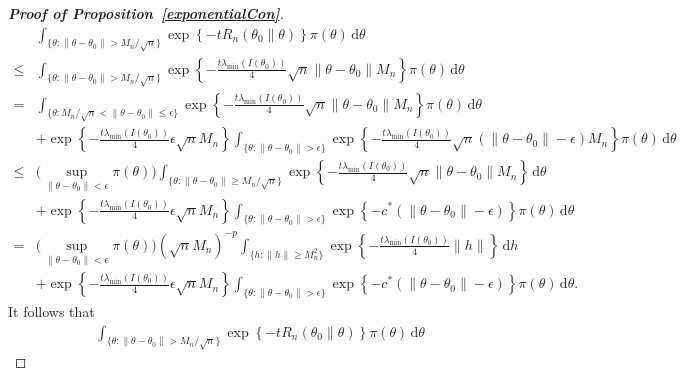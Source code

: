 \documentclass[11pt]{article}
\theoremstyle{plain}
\theoremstyle{definition}
\theoremstyle{remark}
\begin{document}
\begin{appendices}
\begin{proof}[\textbf{Proof of Proposition~\ref{exponentialCon}}]
$$
    \begin{aligned}
        &
\int_{\{\theta:\|\theta-\theta_0\|> M_n/\sqrt{n}\}} \exp\left\{ -t R_n (\theta_0 \| \theta) \right\} \pi(\theta) \, \mathrm d \theta
        \\
        \leq&
        \int_{\{\theta:\|\theta-\theta_0\|> M_n/\sqrt{n}\}} 
        \exp\left\{-\frac{t\lambda_{\min}(I(\theta_0))}{4}\sqrt{n}\|\theta-\theta_0\|M_n\right\}
        \pi(\theta)\, \mathrm d\theta
        \\
        =&
        \int_{\{\theta:M_n/\sqrt{n}< \|\theta-\theta_0\|\leq \epsilon \}} 
        \exp\left\{-\frac{t\lambda_{\min}(I(\theta_0))}{4}\sqrt{n}\|\theta-\theta_0\|M_n\right\}
        \pi(\theta)\, \mathrm d\theta
        \\
        &+
        \exp\left\{ 
            -\frac{t\lambda_{\min}(I(\theta_0))}{4}\epsilon\sqrt{n}M_n
        \right\}
        \int_{\{\theta:\|\theta-\theta_0\|> \epsilon\}} 
        \exp\left\{-\frac{t\lambda_{\min}(I(\theta_0))}{4}\sqrt{n} ( \|\theta-\theta_0\| - \epsilon ) M_n \right\}
        \pi(\theta)\, \mathrm d\theta
        \\
        \leq& 
        \big(\sup_{\|\theta-\theta_0\|<\epsilon}\pi(\theta)\big)
        \int_{\{\theta: \|\theta-\theta_0\|\geq M_n/\sqrt{n}\}} 
        \exp\left\{-\frac{t\lambda_{\min}(I(\theta_0))}{4}\sqrt{n}\|\theta-\theta_0\|M_n\right\}
        \, \mathrm d \theta
        \\
        &+
        \exp\left\{ 
            - \frac{ t \lambda_{\min}(I(\theta_0)) }{4} \epsilon\sqrt n M_n
        \right\}
        \int_{\{\theta:\|\theta-\theta_0\|> \epsilon\}} 
        \exp\left\{- c^* ( \|\theta-\theta_0\| - \epsilon ) \right\}
        \pi(\theta)\, \mathrm d\theta
        \\
        =& 
        \big(\sup_{\|\theta-\theta_0\|<\epsilon}\pi(\theta)\big)
        (\sqrt n M_n)^{-p}
        \int_{\{h: \|h\|\geq M_n^2 \}} 
        \exp\left\{-\frac{t\lambda_{\min}(I(\theta_0))}{4}\|h\| \right\}
        \, \mathrm d h
        \\
        &+
        \exp\left\{ 
            - \frac{ t \lambda_{\min}(I(\theta_0)) }{4} \epsilon\sqrt n M_n
        \right\}
        \int_{\{\theta:\|\theta-\theta_0\|> \epsilon\}} 
        \exp\left\{- c^* ( \|\theta-\theta_0\| - \epsilon ) \right\}
        \pi(\theta)\, \mathrm d\theta
        .
    \end{aligned}
$$
It follows that
\begin{align*}
\int_{\{\theta:\|\theta-\theta_0\|> M_n/\sqrt{n}\}} \exp\left\{ -t R_n (\theta_0 \| \theta) \right\} \pi(\theta) \, \mathrm d \theta

\end{align*}
\end{proof}
\end{appendices}
\end{document}
